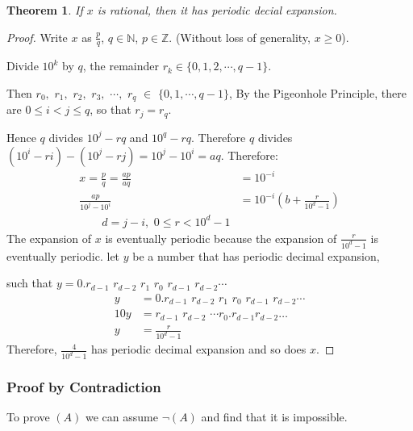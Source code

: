 \documentclass[12pt]{article}
\theoremstyle{plain}
\newtheorem{theorem}{Theorem}[subsection]
\begin{document}
        
        \begin{theorem}
            If $x$ is rational, then it has periodic decial expansion. 
        \end{theorem}
        \begin{proof}
            Write $x$ as $\frac pq$, $q\in\mathbb{N}$, $p \in \mathbb{Z}$. 
            (Without loss of generality, $x \geq 0$).

            Divide $10^k$ by $q$, the remainder 
            $r_k \in \{0 , 1 , 2, \cdots, q-1\}$.

            Then $r_0,$ $r_1,$ $r_2,$ $r_3,$ $\cdots,$ $r_q$ 
            $\in$ $\{0, 1, \cdots, q-1\}$,
            By the Pigeonhole Principle, there are $0 \leq i < j \leq q$, 
            so that $r_j = r_q$.
            
            Hence $q$ divides $10^j - rq$ and $10^q - rq$. Therefore $q$ 
            divides $(10^i -ri)-(10^j - rj) = 10^j-10^i = aq$. 
            Therefore: 
            \begin{align*}
                x = \frac pq = \frac{ap}{aq}&=10^{-i} \\
                \frac{ap}{10^j-10^i}&=10^{-i}(b+\frac{r}{10^d-1})\\
                \qquad d = j-i,\,\, 0\leq r< 10^d-1
            \end{align*}
            The expansion of $x$ is eventually periodic because the 
            expansion of $\frac r{10^d-1}$ is eventually periodic.
            let $y$ be a number that has periodic decimal expansion, 
     
     				such that $y = 0. r_{d-1} \,\, r_{d-2} \,\, r_1 
            \,\,r_0\,\,r_{d-1}\,\, r_{d-2}\cdots$
            \begin{align*}
                y &= 0. r_{d-1} \,\, r_{d-2} \,\, r_1 
											 \,\,r_0\,\,r_{d-1}\,\, r_{d-2}\cdots\\
                10y &= r_{d-1} \,\, r_{d-2}\,\, \cdots r_0. r_{d-1} 
                       r_{d-2}\dots\\
                y &= \frac r{10^d-1}
            \end{align*}
            Therefore, $\frac{4}{10^d-1}$ has periodic decimal expansion
            and so does $x$.
        \end{proof}



        \subsubsection{Proof by Contradiction} 
        To prove $(A)$ we can assume $\neg (A)$ and find that it is impossible.
        
\end{document}
